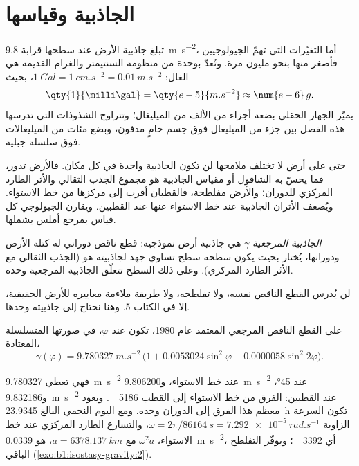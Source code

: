 \section{الجاذبية وقياسها}

تبلغ جاذبية الأرض عند سطحها قرابة \qty{9.8}{m.s^{-2}}، أما التغيّرات التي تهمّ الجيولوجيين فأصغر منها بنحو مليون مرة. وتُعدّ بوحدة من منظومة السنتيمتر والغرام القديمة هي الغال: $\qty{1}{Gal} = \qty{1}{cm.s^{-2}} = \qty{0.01}{m.s^{-2}}$، بحيث
\[
  \qty{1}{\milli\gal} = \qty{e-5}{m.s^{-2}} \approx \num{e-6}\,g .
\]
يميّز الجهاز الحقلي بضعة أجزاء من الألف من الميليغال؛ وتتراوح الشذوذات التي تدرسها هذه الفصل بين جزء من الميليغال فوق جسم خامٍ مدفون، وبضع مئات من الميليغالات فوق سلسلة جبلية.

حتى على أرض لا تختلف ملامحها لن تكون الجاذبية واحدة في كل مكان. فالأرض تدور، فما يحسّ به الشاقول أو مقياس الجاذبية هو مجموع الجذب الثقالي والأثر الطارد المركزي للدوران؛ والأرض مفلطحة، فالقطبان أقرب إلى مركزها من خط الاستواء. ويُضعف الأثران الجاذبية عند خط الاستواء عنها عند القطبين. ويقارن الجيولوجي كل قياس بمرجع أملس يشملها.

\begin{definition}\label{def:b1:isostasy-gravity:normal-gravity}
\emph{الجاذبية المرجعية} $\gamma$ هي جاذبية أرض نموذجية: قطع ناقص دوراني له كتلة الأرض ودورانها، يُختار بحيث يكون سطحه سطح تساوي جهد لجاذبيته هو (الجذب الثقالي مع الأثر الطارد المركزي). وعلى ذلك السطح تتعلّق الجاذبية المرجعية  وحده.
\end{definition}

لن يُدرس القطع الناقص نفسه، ولا تفلطحه، ولا طريقة ملاءمة معاييره للأرض الحقيقية، إلا في الكتاب 5. وهنا نحتاج إلى جاذبيته وحدها.

\begin{proposition}\label{prop:b1:isostasy-gravity:normal-formula}
على القطع الناقص المرجعي المعتمد عام 1980، تكون  عند  $\varphi$، في صورتها المتسلسلة المعتادة،
\[
  \gamma(\varphi) = \qty{9.780327}{m.s^{-2}}\,\bigl(1 + 0.0053024\sin^2\varphi
  - 0.0000058\sin^2 2\varphi\bigr).
\]
\end{proposition}
\admitted

فهي تعطي \qty{9.780327}{m.s^{-2}} عند خط الاستواء، و\qty{9.806200}{m.s^{-2}} عند \ang{45}، و\qty{9.832186}{m.s^{-2}} عند القطبين: الفرق من خط الاستواء إلى القطب \qty{5186}{\milli\gal}. ويعود معظم هذا الفرق إلى الدوران وحده. ومع اليوم النجمي البالغ \qty{23.9345}{h} تكون السرعة الزاوية $\omega = 2\pi/\qty{86164}{s} = \qty{7.292e-5}{rad.s^{-1}}$، والتسارع الطارد المركزي عند خط الاستواء، $\omega^2 a$ مع $a = \qty{6378.137}{km}$، هو \qty{0.0339}{m.s^{-2}}، أي \qty{3392}{\milli\gal}؛ ويوفّر التفلطح الباقي (\cref{exo:b1:isostasy-gravity:2}).

